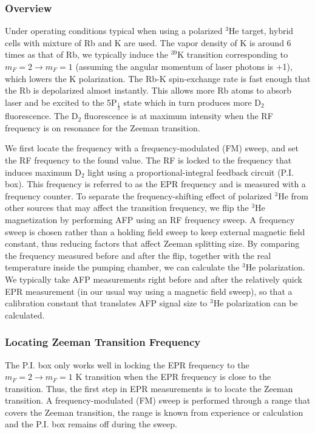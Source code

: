 \subsubsection{Overview}

Under operating conditions typical when using a polarized $^3$He target, hybrid cells with mixture of Rb and K are used. The vapor density of K is around 6 times as that of Rb, we typically induce the $^{39}$K transition corresponding to $m_{F} = 2 \rightarrow m_{F} = 1$ (assuming the angular momentum of laser photons is +1), which lowers the K polarization. The Rb-K spin-exchange rate is fast enough that the Rb is depolarized almost instantly. This allows more Rb atoms to absorb laser and be excited to the 5P$_{\frac{1}{2}}$ state which in turn produces more D$_{2}$ fluorescence. The D$_{2}$ fluorescence is at maximum intensity when the RF frequency is on resonance for the Zeeman transition. 

We first locate the frequency with a frequency-modulated (FM) sweep, and set the RF frequency to the found value. The RF is locked to the frequency that induces maximum D$_{2}$ light using a proportional-integral feedback circuit (P.I. box). This frequency is referred to as the EPR frequency and is measured with a frequency counter. To separate the frequency-shifting effect of polarized $^{3}$He from other sources that may affect the transition frequency, we flip the $^{3}$He magnetization by performing AFP using an RF frequency sweep. A frequency sweep is chosen rather than a holding field sweep  to keep external magnetic field constant, thus reducing factors that affect Zeeman splitting size. By comparing the frequency measured before and after the flip, together with the real temperature inside the pumping chamber, we can calculate the $^{3}$He polarization. We typically take AFP measurements right before and after the relatively quick EPR measurement (in our usual way using a magnetic field sweep), so that a calibration constant that translates AFP signal size to $^{3}$He polarization can be calculated.

\subsubsection{Locating Zeeman Transition Frequency}

The P.I. box only works well in locking the EPR frequency to the $m_{F}=2\rightarrow m_{F}=1$ K transition when the EPR frequency is close to the transition. Thus, the first step in EPR measurements is to locate the Zeeman transition. A frequency-modulated (FM) sweep is performed through a range that covers the Zeeman transition, the range is known from experience or calculation and the P.I. box remains off during the sweep.

